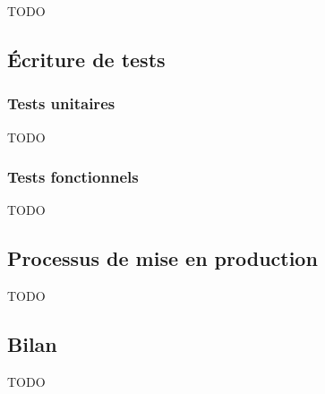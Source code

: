 TODO






\subsection{Écriture de tests}

\subsubsection{Tests unitaires}

TODO

\subsubsection{Tests fonctionnels}

TODO

\subsection{Processus de mise en production}

TODO

\subsection{Bilan}

TODO
